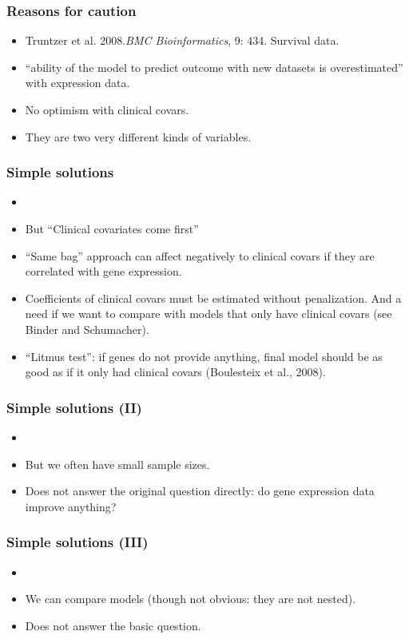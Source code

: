 \begin{frame}
\frametitle{Reasons for caution}
\begin{itemize}
\item Truntzer et al. 2008.\textit{BMC Bioinformatics}, 9: 434. Survival
  data.
\item ``ability of the model to predict outcome with
  new datasets is overestimated'' with expression data. 
\item No optimism with clinical covars.
\item They are two very different kinds of variables.
\end{itemize}
\end{frame}


\begin{frame}
\frametitle{Simple solutions}
\begin{itemize}
\item {}
\item But ``Clinical covariates come first''
\item ``Same bag'' approach can affect negatively to clinical covars if
  they are correlated with gene expression.
\item Coefficients of clinical covars must be estimated without
  penalization. And a need if we want to compare with models that only
  have clinical covars
  (see Binder and Schumacher).
\item ``Litmus test'': if genes do not provide anything, final model
  should be as good as if it only had clinical covars (Boulesteix et
  al., 2008).
\end{itemize}
\end{frame}


\begin{frame}
\frametitle{Simple solutions (II)}
\begin{itemize}
\item {}
\item But we often have small sample sizes.
\item Does not answer the original question directly: do gene expression
  data improve anything?
\end{itemize}
\end{frame}

\begin{frame}
\frametitle{Simple solutions (III)}
\begin{itemize}
\item {}
\item We can compare models (though not obvious: they are not nested).
\item Does not answer the basic question.
\end{itemize}
\end{frame}


